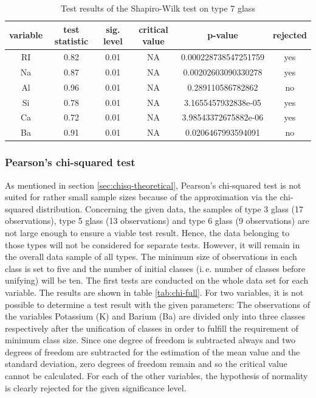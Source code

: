 \documentclass[a4paper, 12pt, titlepage, headsepline, listof = totoc, bibliography = totoc, numbers = noenddot]{scrartcl}
\newcommand{\ie}{i.\,e. }
\begin{document}
\begin{table}[h!]
\centering
\begin{tabular}{|cccccc|} \hline variable & test statistic & sig. level & critical value & p-value & rejected\\ \hline RI & 0.82 & 0.01 & NA & 0.000228738547251759 & yes\\ 
Na & 0.87 & 0.01 & NA & 0.00202603090330278 & yes\\ 
Al & 0.96 & 0.01 & NA & 0.289110586782862 & no\\ 
Si & 0.78 & 0.01 & NA & 3.1655457932838e-05 & yes\\ 
Ca & 0.72 & 0.01 & NA & 3.98543372675882e-06 & yes\\ 
Ba & 0.91 & 0.01 & NA & 0.0206467993594091 & no\\ \hline \end{tabular}\caption{Test results of the Shapiro-Wilk test on type 7 glass}
\label{tab:testrestype7SW}
\end{table}


\subsubsection{Pearson's chi-squared test}

As mentioned in section \ref{sec:chisq-theoretical}, Pearson's chi-squared test is not suited for rather small sample sizes because of the approximation via the chi-squared distribution. Concerning the given data, the samples of type 3 glass (17 observations), type 5 glass (13 observations) and type 6 glass (9 observations) are not large enough to ensure a viable test result. Hence, the data belonging to those types will not be considered for separate tests. However, it will remain in the overall data sample of all types. The minimum size of observations in each class is set to five and the number of initial classes (\ie number of classes before unifying) will be ten. The first tests are conducted on the whole data set for each variable. The results are shown in table \ref{tab:chi-full}. For two variables, it is not possible to determine a test result with the given parameters: The observations of the variables Potassium (K) and Barium (Ba) are divided only into three classes respectively after the unification of classes in order to fulfill the requirement of minimum class size. Since one degree of freedom is subtracted always and two degrees of freedom are subtracted for the estimation of the mean value and the standard deviation, zero degrees of freedom remain and so the critical value cannot be calculated. For each of the other variables, the hypothesis of normality is clearly rejected for the given significance level.
\end{document}
